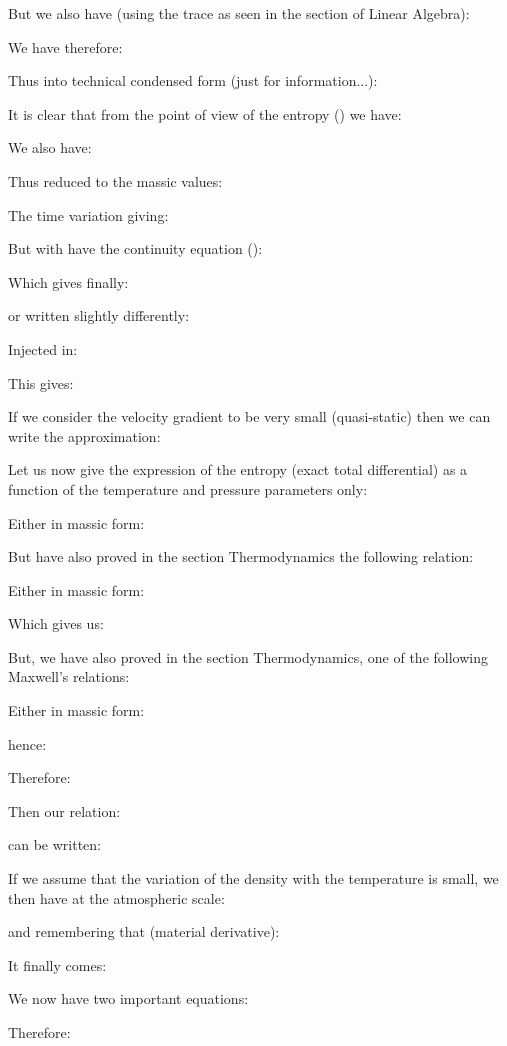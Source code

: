 	But we also have (using the trace as seen in the section of Linear Algebra):
	
	We have therefore:
	
	Thus into technical condensed form (just for information...):
	
	It is clear that from the point of view of the entropy () we have:
	
	We also have:
	
	Thus reduced to the massic values:
	
	The time variation giving:
	
	But with have the continuity equation ():
	
	Which gives finally:
	
	or written slightly differently:
	
	Injected in:
	
	This gives:
	
	If we consider the velocity gradient to be very small (quasi-static) then we can write the approximation:
	
	Let us now give the expression of the entropy (exact total differential) as a function of the temperature and pressure parameters only:
	
	Either in massic form:
	
	But have also proved in the section Thermodynamics the following relation:
	
	Either in massic form:
	
	Which gives us:
	
	But, we have also proved in the section Thermodynamics, one of the following Maxwell's relations:
	
	Either in massic form:
	
	hence:
	
	Therefore:
	
	Then our relation:
	
	can be written:
	
	If we assume that the variation of the density with the temperature is small, we then have at the atmospheric scale:
	
	and remembering that (material derivative):
	
	It finally comes:
	
	We now have two important equations:
	
	Therefore:
	
	
